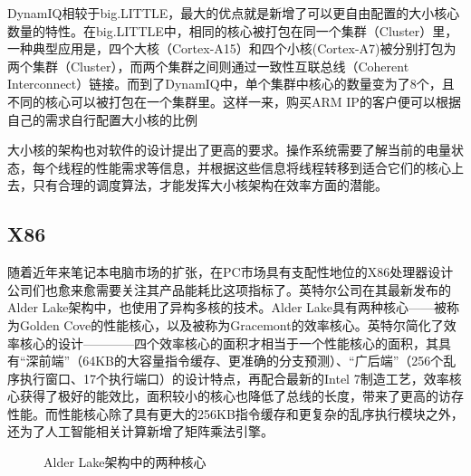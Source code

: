\documentclass[UTF8,a4paper,10pt]{ctexart}
\begin{document}
DynamIQ相较于big.LITTLE，最大的优点就是新增了可以更自由配置的大小核心数量的特性。在big.LITTLE中，相同的核心被打包在同一个集群（Cluster）里，一种典型应用是，四个大核（Cortex-A15）和四个小核(Cortex-A7)被分别打包为两个集群（Cluster），而两个集群之间则通过一致性互联总线（Coherent Interconnect）链接。而到了DynamIQ中，单个集群中核心的数量变为了8个，且不同的核心可以被打包在一个集群里。这样一来，购买ARM IP的客户便可以根据自己的需求自行配置大小核的比例 \cite{arm_dynamiq}

大小核的架构也对软件的设计提出了更高的要求。操作系统需要了解当前的电量状态，每个线程的性能需求等信息，并根据这些信息将线程转移到适合它们的核心上去，只有合理的调度算法，才能发挥大小核架构在效率方面的潜能。

\subsection{X86}

随着近年来笔记本电脑市场的扩张，在PC市场具有支配性地位的X86处理器设计公司们也愈来愈需要关注其产品能耗比这项指标了。英特尔公司在其最新发布的Alder Lake架构中，也使用了异构多核的技术。Alder Lake具有两种核心——被称为Golden Cove的性能核心，以及被称为Gracemont的效率核心。英特尔简化了效率核心的设计————四个效率核心的面积才相当于一个性能核心的面积，其具有“深前端”（64KB的大容量指令缓存、更准确的分支预测）、“广后端”（256个乱序执行窗口、17个执行端口）的设计特点，再配合最新的Intel 7制造工艺，效率核心获得了极好的能效比，面积较小的核心也降低了总线的长度，带来了更高的访存性能。而性能核心除了具有更大的256KB指令缓存和更复杂的乱序执行模块之外，还为了人工智能相关计算新增了矩阵乘法引擎。\cite{intel_archi_day}\cite{intel_alder_lake}

\begin{figure}[htbp]
\centering
{}%
\centering
\caption{Alder Lake架构中的两种核心\cite{intel_archi_day}}
\label{fig:intel_alderlake}
\end{figure}
\end{document}
